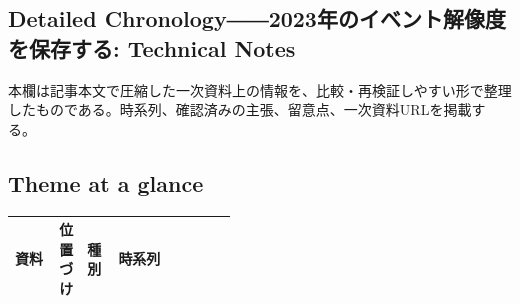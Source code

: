 \subsection*{Detailed Chronology――2023年のイベント解像度を保存する: Technical Notes}
本欄は記事本文で圧縮した一次資料上の情報を、比較・再検証しやすい形で整理したものである。時系列、確認済みの主張、留意点、一次資料URLを掲載する。
\medskip
\subsection*{Theme at a glance}
\begin{center}
\footnotesize
\begin{tabularx}{\linewidth}{@{}p{0.20\linewidth}p{0.10\linewidth}p{0.14\linewidth}X@{}}
\toprule
資料 & 位置づけ & 種別 & 時系列 \\
\midrule
\bottomrule
\end{tabularx}
\end{center}
\normalsize
